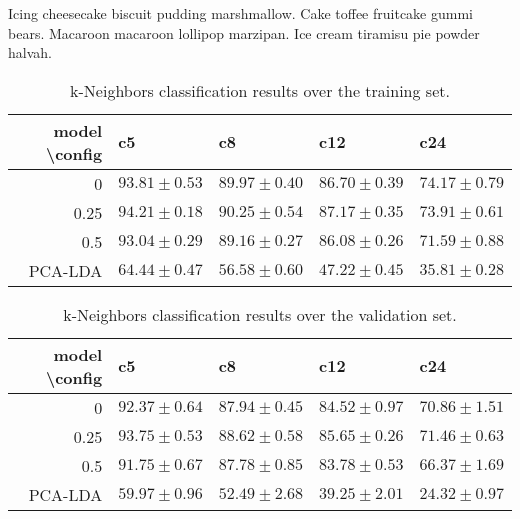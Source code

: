 \noindent
Icing cheesecake biscuit pudding marshmallow.
Cake toffee fruitcake gummi bears.
Macaroon macaroon lollipop marzipan.
Ice cream tiramisu pie powder halvah.





\begin{table*}[h]
\begin{center}
\caption{k-Neighbors classification results over the training set.}
\small
\begin{tabular}{rllll}
 model \textbackslash config  & c5    & c8   & c12  & c24  \\
\hline
 0    & $93.81\pm0.53$ & $89.97\pm0.40$ & $86.70\pm0.39$ & $74.17\pm0.79$ \\
 0.25 & $94.21\pm0.18$ & $90.25\pm0.54$ & $87.17\pm0.35$ & $73.91\pm0.61$ \\
 0.5  & $93.04\pm0.29$ & $89.16\pm0.27$ & $86.08\pm0.26$ & $71.59\pm0.88$ \\
 \hline
 PCA-LDA & $64.44\pm0.47$ & $56.58\pm0.60$ & $47.22\pm0.45$ & $35.81\pm0.28$ \\

\hline
\end{tabular}
\label{tab:things}
\end{center}
\end{table*}

\begin{table*}[h]
\begin{center}
\caption{k-Neighbors classification results over the validation set.}
\small
\begin{tabular}{rllll}
\hline
model \textbackslash config & c5  & c8 & c12   & c24     \\
\hline
 0    & $92.37\pm0.64$ & $87.94\pm0.45$ & $84.52\pm0.97$ & $70.86\pm1.51$ \\
 0.25 & $93.75\pm0.53$ & $88.62\pm0.58$ & $85.65\pm0.26$ & $71.46\pm0.63$ \\
 0.5  & $91.75\pm0.67$ & $87.78\pm0.85$ & $83.78\pm0.53$ & $66.37\pm1.69$ \\
 \hline
 PCA-LDA & $59.97\pm0.96$ & $52.49\pm2.68$ & $39.25\pm2.01$ & $24.32\pm0.97$ \\
\hline
\end{tabular}
\label{tab:things}
\end{center}
\end{table*}


